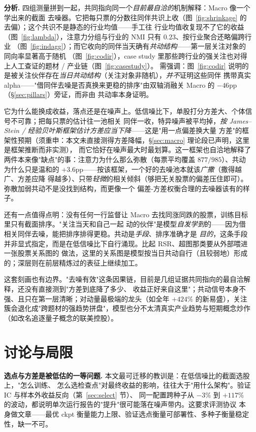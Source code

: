 \documentclass[a4paper,11pt,fontset=fandol]{ctexart}
\begin{document}
\textbf{\heiti 分析.} 四组测量拼到一起，共同指向同一个\emph{目前最自洽的}机制解释：Macro 像一个学出来的截面
去噪器。它把每只票的分数往同伴共识上收（图~\ref{fig:shrinkage} 的去偏）；这个共识不是静态的行业均值——手工往
行业均值收复现不了它的收益（图~\ref{fig:lambda}），注意力分组与行业的 NMI 只有 $0.23$、按行业聚合还略偏跨行业
（图~\ref{fig:indagg}）；而它收向的同伴当天确有\emph{共动结构}——第一层关注对象的同向率显著高于随机
（图~\ref{fig:codir}），case study 里那些跨行业的强关注也对得上人工查证的题材 / 产业链（图~\ref{fig:casestudy}）。
需强调：图~\ref{fig:codir} 说明的是被关注伙伴存在\emph{当日共动结构}（关注对象非随机），\emph{并不}证明这些同伴
携带真实 alpha——"借同伴去噪是否真换来更稳的排序"由双轴消融关 Macro 的 $-46$pp（§\ref{sec:pillars}）旁证，而非由
共动率本身证明。

它为什么能换成收益，落点还是在噪声上。低信噪比下，单股打分方差大、个体信号不可靠；把每只票的估计往一池相关
同伴一收，特异噪声被平均掉，\emph{按 James--Stein / 经验贝叶斯框架估计方差应当下降}——这是"用一点偏差换大量
方差"的框架性预期（须重申：本文未直接测得方差降幅，§\ref{sec:macro} 理论段已声明，这里是框架推断而非实测），
而它恰好在噪声最大时最划算。这一框架也自洽地解释了两件本来像"缺点"的事：注意力为什么那么弥散（每票平均覆盖
$877/985$）、共动为什么只是温和的 $+3.6$pp——按该框架，一个好的去噪池本就该\emph{广撒}（撒得越广、方差应降
得越多）、只带\emph{轻微}的相关倾斜（够把无关股票的偏差压住即可）。弥散加弱共动不是没找到结构，而更像一个
偏差-方差权衡合理的去噪器该有的样子。

还有一点值得点明：没有任何一行监督让 Macro 去找同涨同跌的股票，训练目标里只有截面排序。"关注当天和自己一起
动的伙伴"是模型\emph{自发学到}的——因为借相关同伴去噪，能把排序排得更稳。共动是\emph{手段}、排序准确才是
\emph{目的}，这条手段并非显式指定，而是在低信噪比下自行涌现。比起 RSR、超图那类要从外部喂进一张股票关系图的
做法，这里的关系图是模型按当日共动自行（且较弱地）形成的；深层则在前层精炼过的表征上继续加工。

这套刻画也有边界。"去噪有效"这条因果链，目前是几组证据共同指向的最自洽解释，还没有直接测到"方差到底降了多少、
收益正好来自这里"；共动信号本身不强、且只在第一层清晰；对动量最极端的龙头（如全年 $+424\%$ 的新易盛），关注
簇会退化成"跨题材的强趋势拼盘"，模型也分不太清真实产业趋势与短期概念炒作（如改名追逐量子概念的联美控股）。


\section{讨论与局限}\label{sec:discuss}
\textbf{\heiti 选点与方差是被低估的一等问题.} 本文最可迁移的教训是：在低信噪比的截面选股上，"怎么训练、
怎么选检查点"对最终收益的影响，往往大于"用什么架构"。验证 IC 与样本外收益反向（第~\ref{sec:select} 节）、
同一配置跨种子从 $-3\%$ 到 $+117\%$ 的波动，都说明单次运行报告的"提升"很可能落在噪声带内。这要求评测协议
本身做文章——最优 ckpt 衡量能力上限、验证选点衡量可部署性、多种子衡量稳定性，缺一不可。
\end{document}
